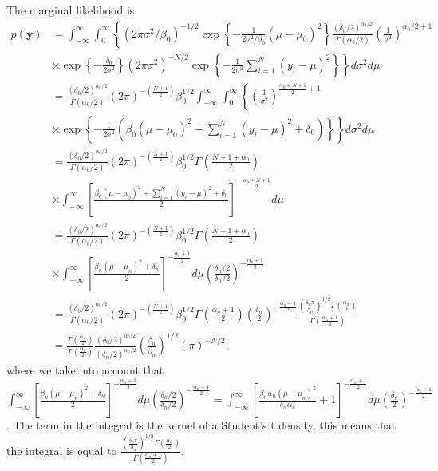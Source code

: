 \begin{enumerate}
The marginal likelihood is
{\footnotesize{
\begin{align}
	p(\bm{y})&=\int_{-\infty}^{\infty}\int_{0}^{\infty}\left\{ (2\pi\sigma^2/\beta_0)^{-1/2}\exp\left\{-\frac{1}{2\sigma^2/\beta_0}(\mu-\mu_0)^2\right\}\frac{(\delta_0/2)^{\alpha_0/2}}{\Gamma(\alpha_0/2)}\left(\frac{1}{\sigma^2}\right)^{\alpha_0/2+1}\right.\nonumber\\
	&\times\left.\exp\left\{-\frac{\delta_0}{2\sigma^2}\right\}(2\pi\sigma^2)^{-N/2}\exp\left\{-\frac{1}{2\sigma^2}\sum_{i=1}^N(y_i-\mu)^2\right\}\right\}d\sigma^2d\mu\nonumber\\
	&=\frac{(\delta_0/2)^{\alpha_0/2}}{\Gamma(\alpha_0/2)}(2\pi)^{-\left(\frac{N+1}{2}\right)}\beta_0^{1/2}\int_{-\infty}^{\infty}\int_{0}^{\infty}\left\{\left(\frac{1}{\sigma^2}\right)^{\frac{\alpha_0+N+1}{2}+1}\right.\nonumber\\
	&\times\left.\exp\left\{-\frac{1}{2\sigma^2}(\beta_0(\mu-\mu_0)^2+\sum_{i=1}^N (y_i-\mu)^2+\delta_0)\right\}\right\}d\sigma^2d\mu\nonumber\\
	&=\frac{(\delta_0/2)^{\alpha_0/2}}{\Gamma(\alpha_0/2)}(2\pi)^{-\left(\frac{N+1}{2}\right)}\beta_0^{1/2}\Gamma\left(\frac{N+1+\alpha_0}{2}\right)\nonumber\\
	&\times \int_{-\infty}^{\infty} \left[\frac{\beta_0(\mu-\mu_0)^2+\sum_{i=1}^N(y_i-\mu)^2+\delta_0}{2}\right]^{-\frac{\alpha_0+N+1}{2}}d\mu\nonumber\\
	&=\frac{(\delta_0/2)^{\alpha_0/2}}{\Gamma(\alpha_0/2)}(2\pi)^{-\left(\frac{N+1}{2}\right)}\beta_0^{1/2}\Gamma\left(\frac{N+1+\alpha_0}{2}\right)\nonumber\\
	&\times \int_{-\infty}^{\infty} \left[\frac{\beta_n(\mu-\mu_n)^2+\delta_n}{2}\right]^{-\frac{\alpha_n+1}{2}}d\mu\left(\frac{\delta_n/2}{\delta_n/2}\right)^{-\frac{\alpha_n+1}{2}}\nonumber\\
	&=\frac{(\delta_0/2)^{\alpha_0/2}}{\Gamma(\alpha_0/2)}(2\pi)^{-\left(\frac{N+1}{2}\right)}\beta_0^{1/2}\Gamma\left(\frac{\alpha_n+1}{2}\right)\left(\frac{\delta_n}{2}\right)^{-\frac{\alpha_n+1}{2}}\frac{\left(\frac{\delta_n\pi}{\beta_n}\right)^{1/2}\Gamma\left(\frac{\alpha_n}{2}\right)}{\Gamma\left(\frac{\alpha_n+1}{2}\right)}\nonumber\\
	&=\frac{\Gamma\left(\frac{\alpha_n}{2}\right)}{\Gamma\left(\frac{\alpha_0}{2}\right)}\frac{(\delta_0/2)^{\alpha_0/2}}{(\delta_n/2)^{\alpha_n/2}}\left(\frac{\beta_0}{\beta_n}\right)^{1/2}(\pi)^{-N/2},\nonumber
\end{align}
}}
where we take into account that $\int_{-\infty}^{\infty} \left[\frac{\beta_n(\mu-\mu_n)^2+\delta_n}{2}\right]^{-\frac{\alpha_n+1}{2}}d\mu\left(\frac{\delta_n/2}{\delta_n/2}\right)^{-\frac{\alpha_n+1}{2}}=\int_{-\infty}^{\infty} \left[\frac{\beta_n\alpha_n(\mu-\mu_n)^2}{\delta_n\alpha_n}+1\right]^{-\frac{\alpha_n+1}{2}}d\mu\left(\frac{\delta_n}{2}\right)^{-\frac{\alpha_n+1}{2}}$. The term in the integral is the kernel of a Student's t density, this means that the integral is equal to $\frac{\left(\frac{\delta_n\pi}{\beta_n}\right)^{1/2}\Gamma\left(\frac{\alpha_n}{2}\right)}{\Gamma\left(\frac{\alpha_n+1}{2}\right)}$.  


\end{enumerate}
